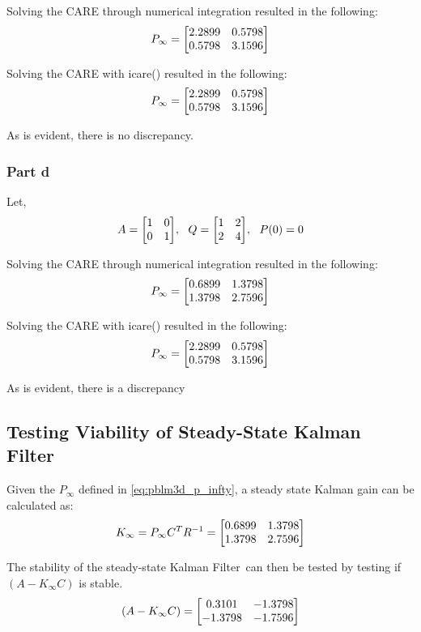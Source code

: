 \documentclass[]{article}
\newcommand{\KF}{Kalman Filter}
\begin{document}
			Solving the CARE through numerical integration resulted in the following:
			\begin{equation}
				P_\infty = \mqty[2.2899 &0.5798\\ 0.5798 &3.1596]
			\end{equation}
			
			Solving the CARE with icare() resulted in the following:
			\begin{equation}
				P_\infty = \mqty[2.2899 &0.5798\\ 0.5798 &3.1596]
			\end{equation}
			
			As is evident, there is no discrepancy.
			
		\subsubsection{Part d}
			Let,
			\begin{equation}
				A = \mqty[\dmat[0]{1,1}], \ \ Q = \mqty[\dmat[2]{1,4}], \ \ P(0) = 0
			\end{equation}
			
			Solving the CARE through numerical integration resulted in the following:
			\begin{equation}
				P_\infty = \mqty[0.6899 &1.3798\\ 1.3798 &2.7596]
				\label{eq:pblm3d_p_infty}
			\end{equation}
			
			Solving the CARE with icare() resulted in the following:
			\begin{equation}
				P_\infty = \mqty[2.2899 &0.5798\\ 0.5798 &3.1596]
			\end{equation}
			
			As is evident, there is a discrepancy
	
	\subsection{Testing Viability of Steady-State \KF}
		Given the $P_\infty$ defined in \eqref{eq:pblm3d_p_infty}, a steady state Kalman gain can be calculated as:
		\begin{equation}
			K_\infty = P_\infty C^T R^{-1} = \mqty[0.6899 &1.3798\\ 1.3798 &2.7596]
		\end{equation}
		
		The stability of the steady-state \KF \ can then be tested by testing if $(A-K_\infty C)$ is stable.
		\begin{equation}
			(A - K_\infty C) = \mqty[0.3101 &-1.3798\\ -1.3798 &-1.7596]
		\end{equation}
		
\end{document}
